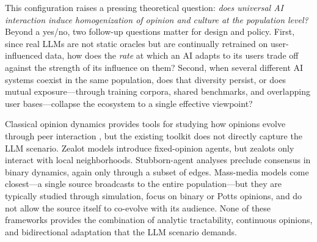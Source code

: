 \documentclass{article}
\theoremstyle{plain}
\theoremstyle{definition}
\theoremstyle{remark}
\begin{document}
This configuration raises a pressing theoretical question: \emph{does
universal AI interaction induce homogenization of opinion and culture
at the population level?}  Beyond a yes/no, two follow-up questions
matter for design and policy. First, since real LLMs are not static
oracles but are continually retrained on user-influenced data, how does
the \emph{rate} at which an AI adapts to its users trade off against
the strength of its influence on them?  Second, when several different
AI systems coexist in the same population, does that diversity persist,
or does mutual exposure---through training corpora, shared benchmarks,
and overlapping user bases---collapse the ecosystem to a single
effective viewpoint?

Classical opinion dynamics provides tools for studying how opinions
evolve through peer interaction \citep{castellano2009}, but the
existing toolkit does not directly capture the LLM scenario.  Zealot
models \citep{mobilia2003, mobilia2007} introduce fixed-opinion agents,
but zealots only interact with local neighborhoods.  Stubborn-agent
analyses \citep{acemoglu2013binary} preclude consensus in binary
dynamics, again only through a subset of edges.  Mass-media models
\citep{crokidakis2014, chica2023} come closest---a single source
broadcasts to the entire population---but they are typically studied
through simulation, focus on binary or Potts opinions, and do not
allow the source itself to co-evolve with its audience.  None of
these frameworks provides the combination of analytic tractability,
continuous opinions, and bidirectional adaptation that the LLM
scenario demands.
\end{document}
